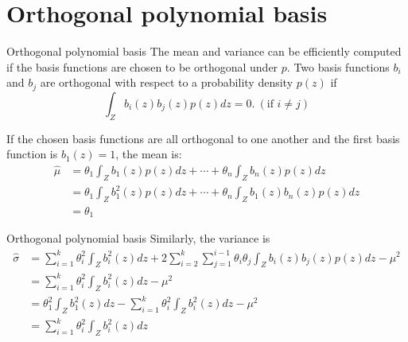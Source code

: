 \documentclass{beamer}
\begin{document}
\section{Orthogonal polynomial basis}
\begin{frame}{Orthogonal polynomial basis}
The mean and variance can be efficiently computed if the basis functions are chosen to be orthogonal under $p$. Two basis functions $b_i$ and $b_j$ are orthogonal with respect to a probability density $p(z)$ if
\begin{equation*}
     \int_Z b_i(z)b_j(z)p(z)dz = 0. ~({\textrm{if~}} i\neq j)
\end{equation*}

If the chosen basis functions are all orthogonal to one another and the first basis function is $b_1(z) = 1$, the mean is:
\begin{equation*}
\begin{split}
    \hat{\mu} & = \theta_1 \int_Z b_1(z) p(z)dz + \cdots + \theta_n \int_Z b_n(z) p(z)dz\\
    & = \theta_1 \int_Z b^2_1(z) p(z)dz + \cdots + \theta_n \int_Z b_1(z) b_n(z) p(z)dz\\
    & = \theta_1
\end{split}
\end{equation*}

\end{frame}

\begin{frame}{Orthogonal polynomial basis}
Similarly, the variance is 
\begin{equation*}
\begin{split}
    \hat{\sigma} & = \sum_{i=1}^k \theta_i^2 \int_Z b_i^2(z)dz + 2\sum_{i=2}^k\sum_{j=1}^{i-1} \theta_i\theta_j \int_Z b_i(z)b_j(z)p(z)dz - \mu^2\\
    & = \sum_{i=1}^k \theta_i^2 \int_Z b_i^2(z)dz - \mu^2 \\
    & = \theta_1^2 \int_Z b_1^2(z)dz - \sum_{i=1}^k \theta_i^2 \int_Z b_i^2(z)dz- \mu^2 \\
    & = \sum_{i=1}^k \theta_i^2 \int_Z b_i^2(z)dz
\end{split}
\end{equation*}

\end{frame}
\end{document}
